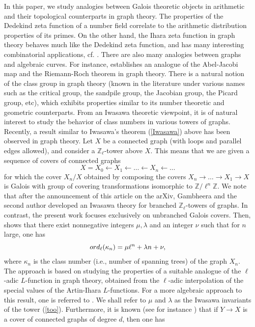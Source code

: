 \documentclass[11pt]{amsart}
\numberwithin{equation}{section}
\theoremstyle{remark}
\begin{document}
In this paper, we study analogies between Galois theoretic objects in arithmetic and their topological counterparts in graph theory. The properties of the Dedekind zeta function of a number field correlate to the arithmetic distribution properties of its primes. On the other hand, the Ihara zeta function in graph theory behaves much like the Dedekind zeta function, and has many interesting combinatorial applications, cf. \cite{Terras:2011}. There are also many analogies between graphs and algebraic curves. For instance, \cite{Baker/Norine:2009} establishes an analogue of the Abel-Jacobi map and the Riemann-Roch theorem in graph theory. There is a natural notion of the class group in graph theory (known in the literature under various names such as the critical group, the sandpile group, the Jacobian group, the Picard group, etc), which exhibits properties similar to its number theoretic and geometric counterparts. From an Iwasawa theoretic viewpoint, it is of natural interest to study the behavior of class numbers in various towers of graphs. Recently, a result similar to Iwasawa's theorem (\ref{Iwasawa}) above has been observed in graph theory. Let $X$ be a connected graph (with loops and parallel edges allowed), and consider a $\mathbb{Z}_{\ell}$-tower above $X$.  This means that we are given a sequence of covers of connected graphs
\begin{equation} \label{too}
X = X_{0} \leftarrow X_{1} \leftarrow \ldots \leftarrow X_{n} \leftarrow \ldots
\end{equation}
for which the cover $X_{n}/X$ obtained by composing the covers $X_{n} \rightarrow \ldots \rightarrow X_{1} \rightarrow X$ is Galois with group of covering transformations isomorphic to $\mathbb{Z}/\ell^{n}\mathbb{Z}$. We note that after the announcement of this article on the arXiv, Gambheera and the second author \cite{GambheeraVallieres} developed an Iwasawa theory for branched \(\mathbb{Z}_\ell\)-towers of graphs. In contrast, the present work focuses exclusively on unbranched Galois covers.  Then, \cite[Theorem 6.1]{mcgownvallieresIII} shows that there exist nonnegative integers $\mu,\lambda$ and an integer $\nu$ such that for $n$ large, one has
$${\rm ord}_{\ell}(\kappa_{n}) = \mu \ell^{n} + \lambda n + \nu, $$
where $\kappa_{n}$ is the class number (i.e., number of spanning trees) of the graph $X_{n}$. The approach is based on studying the properties of a suitable analogue of the $\ell$-adic $L$-function in graph theory, obtained from the $\ell$-adic interpolation of the special values of the Artin-Ihara $L$-functions. For a more algebraic approach to this result, one is referred to \cite{Gonet:2021a, Gonet:2022}.  We shall refer to $\mu$ and $\lambda$ as the Iwasawa invariants of the tower (\ref{too}).  Furthermore, it is known (see for instance \cite[page 55]{Sunada:2013}) that if $Y \rightarrow X$ is a cover of connected graphs of degree $d$, then one has
\end{document}
